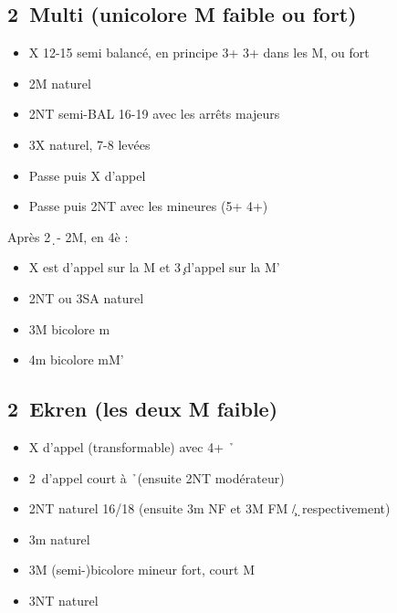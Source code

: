 \documentclass[a4paper]{article}
\begin{document}
\subsection{2\pdfd\ Multi (unicolore M faible ou fort)}

\begin{itemize}
\item X 12-15 semi balancé, en principe 3+ 3+ dans les M, ou fort

\item 2M naturel

\item 2NT semi-BAL 16-19 avec les arrêts majeurs

\item 3X naturel, 7-8 levées

\item Passe puis X d'appel

\item Passe puis 2NT avec les mineures (5+ 4+)

\end{itemize}

Après 2\d\ - 2M, en 4è :

\begin{itemize}
\item X est d'appel sur la M et 3\c\ d'appel sur la M'

\item 2NT ou 3SA naturel

\item 3M bicolore m 

\item 4m bicolore mM'

\end{itemize}

\subsection{2\pdfh\ Ekren (les deux M faible)}

\begin{itemize}
\item X d'appel (transformable) avec 4+ \h\ 

\item 2\s\ d'appel court à \h\ (ensuite 2NT modérateur)

\item 2NT naturel 16/18 (ensuite 3m NF et 3M FM \c /\d\ respectivement)

\item 3m naturel

\item 3M (semi-)bicolore mineur fort, court M

\item 3NT naturel

\end{itemize}
\end{document}
